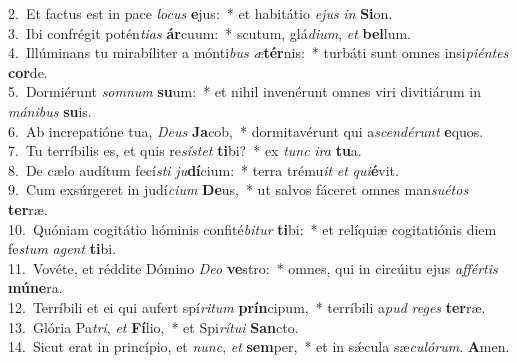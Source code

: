 {2.~}Et factus est in pace \textit{lo}\textit{cus} \textbf{e}jus:~* et habitátio \textit{e}\textit{jus} \textit{in} \textbf{Si}on.\\
{3.~}Ibi confrégit potén\textit{ti}\textit{as} \textbf{ár}cuum:~* scutum, glá\textit{di}\textit{um}, \textit{et} \textbf{bel}lum.\\
{4.~}Illúminans tu mirabíliter a mónti\textit{bus} \textit{æ}\textbf{tér}nis:~* turbáti sunt omnes insi\textit{pi}\textit{én}\textit{tes} \textbf{cor}de.\\
{5.~}Dormiérunt \textit{som}\textit{num} \textbf{su}um:~* et nihil invenérunt omnes viri divitiárum in \textit{má}\textit{ni}\textit{bus} \textbf{su}is.\\
{6.~}Ab increpatióne tua, \textit{De}\textit{us} \textbf{Ja}cob,~* dormitavérunt qui a\textit{scen}\textit{dé}\textit{runt} \textbf{e}quos.\\
{7.~}Tu terríbilis es, et quis re\textit{sí}\textit{stet} \textbf{ti}bi?~* ex \textit{tunc} \textit{i}\textit{ra} \textbf{tu}a.\\
{8.~}De cælo audítum fecí\textit{sti} \textit{ju}\textbf{dí}cium:~* terra trému\textit{it} \textit{et} \textit{qui}\textbf{é}vit.\\
{9.~}Cum exsúrgeret in judí\textit{ci}\textit{um} \textbf{De}us,~* ut salvos fáceret omnes man\textit{su}\textit{é}\textit{tos} \textbf{ter}ræ.\\
{10.~}Quóniam cogitátio hóminis confité\textit{bi}\textit{tur} \textbf{ti}bi:~* et relíquiæ cogitatiónis diem fe\textit{stum} \textit{a}\textit{gent} \textbf{ti}bi.\\
{11.~}Vovéte, et réddite Dómino \textit{De}\textit{o} \textbf{ve}stro:~* omnes, qui in circúitu ejus \textit{af}\textit{fér}\textit{tis} \textbf{mú}\textbf{ne}ra.\\
{12.~}Terríbili et ei qui aufert spí\textit{ri}\textit{tum} \textbf{prín}cipum,~* terríbili a\textit{pud} \textit{re}\textit{ges} \textbf{ter}ræ.\\
{13.~}Glória Pa\textit{tri}, \textit{et} \textbf{Fí}lio,~* et Spi\textit{rí}\textit{tu}\textit{i} \textbf{San}cto.\\
{14.~}Sicut erat in princípio, et \textit{nunc}, \textit{et} \textbf{sem}per,~* et in sǽcula sæ\textit{cu}\textit{ló}\textit{rum}. \textbf{A}men.\\
